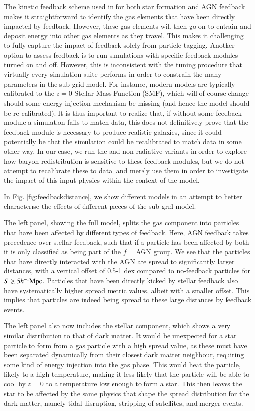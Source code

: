 The kinetic feedback scheme used in \simba{} for both star formation and AGN
feedback makes it straightforward to identify the gas elements that have been
directly impacted by feedback. However, these gas elements will then go on to
entrain and deposit energy into other gas elements as they travel. This makes
it challenging to fully capture the impact of feedback solely from particle
tagging. Another option to assess feedback is to run simulations with
specific feedback modules turned on and off. However, this is inconsistent
with the tuning procedure that virtually every simulation suite performs in
order to constrain the many parameters in the sub-grid model. For instance,
modern models are typically calibrated to the $z=0$ Stellar Mass Function
(SMF), which will of course change should some energy injection mechanism be
missing (and hence the model should be re-calibrated). It is thus important
to realize that, if without some feedback module a simulation fails to match
data, this does not definitively prove that the feedback module is necessary
to produce realistic galaxies, since it could potentially be that the
simulation could be recalibrated to match data in some other way. In our
case, we run the \nojet{} and non-radiative variants in order to explore how
baryon redistribution is sensitive to these feedback modules, but we do not
attempt to recalibrate these to data, and merely use them in order to
investigate the impact of this input physics within the context of the
\simba{} model.

In Fig. \ref{fig:feedbackdistance}, we show different models in an attempt
to better characterise the effects of different pieces of the \simba{}
sub-grid model.

The left panel, showing the full \simba{} model, splits the gas component
into particles that have been affected by different types of feedback. Here,
AGN feedback takes precedence over stellar feedback, such that if a particle
has been affected by both it is only classified as being part of the $f=$AGN
group. We see that the particles that have directly interacted with the AGN
are spread to significantly larger distances, with a vertical offset of 0.5-1
dex compared to no-feedback particles for $S \gtrsim 5h^{-1}{\rm Mpc}{}$.
Particles that have been directly kicked by stellar feedback also have
systematically higher spread metric values, albeit with a smaller offset.
This implies that particles are indeed being spread to these large distances
by feedback events.

The left panel also now includes the stellar component, which shows a very
similar distribution to that of dark matter. It would be unexpected for a
star particle to form from a gas particle with a high spread value, as these
must have been separated dynamically from their closest dark matter
neighbour, requiring some kind of energy injection into the gas phase. This
would heat the particle, likely to a high temperature, making it less likely
that the particle will be able to cool by $z=0$ to a temperature low enough
to form a star. This then leaves the star to be affected by the same physics
that shape the spread distribution for the dark matter, namely tidal disruption,
stripping of satellites, and merger events.


